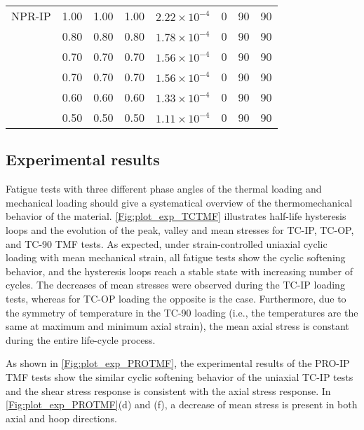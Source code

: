 \begin{table}[htbp]
\begin{tabular}{p{2cm}<{\centering}p{1.5cm}<{\centering}p{1.5cm}<{\centering}p{1.5cm}<{\centering}p{2.5cm}<{\centering}p{1cm}<{\centering}p{1cm}<{\centering}p{1cm}<{\centering}}
    \midrule
    NPR-IP & 1.00  & 1.00  & 1.00  & $2.22\times 10^{-4}$ & 0     & 90    & 90 \\
          & 0.80  & 0.80  & 0.80  & $1.78\times 10^{-4}$ & 0     & 90    & 90 \\
          & 0.70  & 0.70  & 0.70  & $1.56\times 10^{-4}$ & 0     & 90    & 90 \\
          & 0.70  & 0.70  & 0.70  & $1.56\times 10^{-4}$ & 0     & 90    & 90 \\
          & 0.60  & 0.60  & 0.60  & $1.33\times 10^{-4}$ & 0     & 90    & 90 \\
          & 0.50  & 0.50  & 0.50  & $1.11\times 10^{-4}$ & 0     & 90    & 90 \\
    \bottomrule
    \end{tabular}%
  \label{tab:test_program_tmf}%
\end{table}%

\subsection{Experimental results}
\noindent
Fatigue tests with three different phase angles of the thermal loading and mechanical loading should give a systematical overview of the thermomechanical behavior of the material. \ref{Fig:plot_exp_TCTMF} illustrates half-life hysteresis loops and the evolution of the peak, valley and mean stresses for TC-IP, TC-OP, and TC-90 TMF tests. As expected, under strain-controlled uniaxial cyclic loading with mean mechanical strain, all fatigue tests show the cyclic softening behavior, and the hysteresis loops reach a stable state with increasing number of cycles. The decreases of mean stresses were observed during the TC-IP loading tests, whereas for TC-OP loading the opposite is the case. Furthermore, due to the symmetry of temperature in the TC-90 loading (i.e., the temperatures are the same at maximum and minimum axial strain), the mean axial stress is constant during the entire life-cycle process.

As shown in \ref{Fig:plot_exp_PROTMF}, the experimental results of the PRO-IP TMF tests show the similar cyclic softening behavior of the uniaxial TC-IP tests and the shear stress response is consistent with the axial stress response. In \ref{Fig:plot_exp_PROTMF}(d) and (f), a decrease of mean stress is present in both axial and hoop directions.

